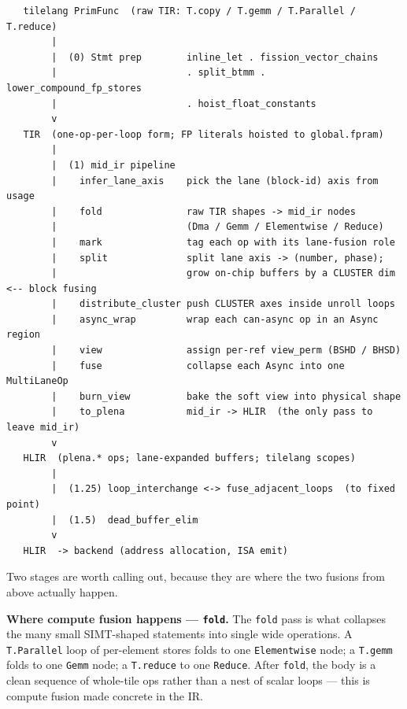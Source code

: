 \documentclass[
  10pt,
]{article}
\begin{document}
\begin{verbatim}
   tilelang PrimFunc  (raw TIR: T.copy / T.gemm / T.Parallel / T.reduce)
        |
        |  (0) Stmt prep        inline_let . fission_vector_chains
        |                       . split_btmm . lower_compound_fp_stores
        |                       . hoist_float_constants
        v
   TIR  (one-op-per-loop form; FP literals hoisted to global.fpram)
        |
        |  (1) mid_ir pipeline
        |    infer_lane_axis    pick the lane (block-id) axis from usage
        |    fold               raw TIR shapes -> mid_ir nodes
        |                       (Dma / Gemm / Elementwise / Reduce)
        |    mark               tag each op with its lane-fusion role
        |    split              split lane axis -> (number, phase);
        |                       grow on-chip buffers by a CLUSTER dim   <-- block fusing
        |    distribute_cluster push CLUSTER axes inside unroll loops
        |    async_wrap         wrap each can-async op in an Async region
        |    view               assign per-ref view_perm (BSHD / BHSD)
        |    fuse               collapse each Async into one MultiLaneOp
        |    burn_view          bake the soft view into physical shape
        |    to_plena           mid_ir -> HLIR  (the only pass to leave mid_ir)
        v
   HLIR  (plena.* ops; lane-expanded buffers; tilelang scopes)
        |
        |  (1.25) loop_interchange <-> fuse_adjacent_loops  (to fixed point)
        |  (1.5)  dead_buffer_elim
        v
   HLIR  -> backend (address allocation, ISA emit)
\end{verbatim}

Two stages are worth calling out, because they are where the two fusions
from above actually happen.

\textbf{Where compute fusion happens --- \texttt{fold}.} The \texttt{fold}
pass is what collapses the many small SIMT-shaped statements into single
wide operations. A \texttt{T.Parallel} loop of per-element stores folds
to one \texttt{Elementwise} node; a \texttt{T.gemm} folds to one
\texttt{Gemm} node; a \texttt{T.reduce} to one \texttt{Reduce}. After
\texttt{fold}, the body is a clean sequence of whole-tile ops rather than
a nest of scalar loops --- this is compute fusion made concrete in the
IR.
\end{document}
